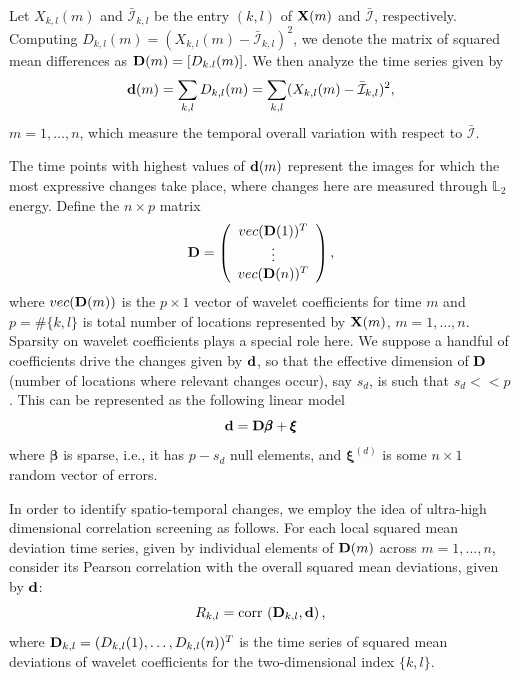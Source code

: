 \documentclass[journal]{IEEEtran}
\def\corr{\mbox{{\rm corr\,}}}
\newcommand{\vbeta}{\pmb{\beta}}
\newcommand{\vxi}{\pmb{\xi}}
\newcommand{\vD}{{\textbf D}}
\newcommand{\vd}{{\textbf d}}
\newcommand{\vX}{{\textbf X}}
\begin{document}
Let $X_{k,l}(m)$ and $\bar{\mathcal{I}}_{k,l}$ be the entry $(k,l)$ of $\vX(m)$ and $\bar{\mathcal{I}}$, respectively. Computing $D_{k,l}(m)=(X_{k,l}(m)-\bar{\mathcal{I}}_{k,l})^2$, we denote the matrix of squared mean differences as $\vD(m) = [D_{k.l}(m)]$. We then 
analyze the time series given by
\begin{equation} 
\vd(m)= \sum_{k,l}D_{k,l}(m) = \sum_{k,l}(X_{k,l}(m) - \bar{\mathcal{I}}_{k,l})^2,
\label{E:eq_defdm}
\end{equation}
$m=1,\ldots,n$, which measure the temporal overall variation with respect to $\bar{\mathcal{I}}$.

The time points with highest values of $\vd(m)$ represent the images for which the most expressive changes take place, where changes here are measured through $\mathbb{L}_2$ energy. Define the  $n\times p$ matrix
\begin{equation*}
 \vD=\left(
 \begin{array}{c}
 vec(\vD(1))^T\\
 \vdots\\
 vec(\vD(n))^T\\
 \end{array}
 \right),
\label{eq_defmatrixD}
\end{equation*}
where $vec(\vD(m))$ is the $p\times 1$ vector of wavelet coefficients for time $m$ and $p=\#\{k,l\}$ is total number of locations represented by $\vX(m)$, $m=1,\ldots,n$. Sparsity \cite{johnstone2009statistical} on wavelet coefficients plays a special role here.  We suppose a handful of coefficients drive the changes given by $\vd$, so that the effective dimension of $\vD$ (number of locations where relevant changes occur), say $s_d$, is such that $s_d<<p$. This can be represented as the following linear model
\begin{equation} 
\vd=\vD\vbeta+\vxi
\label{E:sparsemodel_d}
\end{equation}
where $\vbeta$ is sparse, i.e., it has $p-s_d$ null elements, and $\vxi^{(d)}$ is some $n\times 1$ random vector of errors.

In order to identify spatio-temporal changes, we employ the idea of ultra-high dimensional correlation screening \cite{fan2020statistical} as follows. For each local squared mean deviation time series, given by individual elements of $\vD(m)$ across $m=1,\ldots,n$, consider its Pearson correlation with the overall squared mean deviations, given by $\vd$:
\begin{equation*}
R_{k,l}= \corr\left( \vD_{k,l}, \vd\right),
\label{def_Rkld}
\end{equation*}
where $\vD_{k,l}=(D_{k,l}(1),\ldots,D_{k,l}(n))^T$ is the time series of squared mean deviations of wavelet coefficients for the two-dimensional index $\{k,l\}$.
\end{document}

